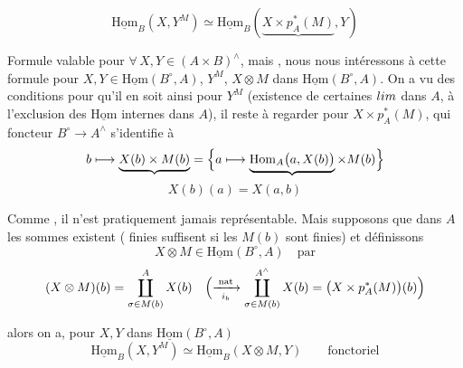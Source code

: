\documentclass[11pt,a4paper]{article}
\begin{document}


\[
\underline{\mathrm{Hom}}_B(X, Y^{M}) \simeq
\underline{\mathrm{Hom}}_B(\underbrace{X \times p_A^{*}(M)}, Y)
\]

Formule valable pour $\forall\, X, Y \in (A \times B)^{\wedge}$, mais
,  nous nous intéressons à cette formule pour
$X, Y \in \underline{\mathrm{Hom}}(B^{\circ}, A)$, \ill{} \ill{} \ill{}
  $Y^{M}$, $X \otimes M$ dans
$\underline{\mathrm{Hom}}(B^{\circ}, A)$. On a vu des conditions
 pour qu'il en soit ainsi pour $Y^{M}$ (existence de
certaines $\varprojlim$ dans $A$, à l'exclusion des
$\underline{\mathrm{Hom}}$ internes dans $A$), il reste à regarder pour
$X \times p_A^{*}(M)$, qui  foncteur $B^{\circ} \to
A^{\wedge}$ s'identifie à
\[
b \longmapsto \underbrace{X(b) \times M(b)} = \Bigl\{ a \longmapsto
\underbrace{\mathrm{Hom}_A\bigl(a, X(b)\bigr)} \times M(b) \Bigr\}
\]
\[
X(b)(a) = X(a, b)
\]

Comme , il n'est pratiquement jamais représentable. Mais
supposons que dans $A$ les sommes existent ( finies
suffisent si les $M(b)$ sont  finies) et définissons
\[
X \otimes M \in \underline{\mathrm{Hom}}(B^{\circ}, A) \quad \text{par}
\]
\[
(X \otimes M)(b) = \coprod^{A}_{\sigma \in M(b)} X(b)
\quad \Bigl( \xrightarrow[\;i_b\;]{\;\text{nat}\;}
\coprod^{A^{\wedge}}_{\sigma \in M(b)} X(b) = \bigl(X \times p_A^{*}(M)\bigr)(b) \Bigr)
\]

alors on a, pour $X, Y$ dans $\underline{\mathrm{Hom}}(B^{\circ}, A)$
\[
\underline{\mathrm{Hom}}_B(X, Y^{M}) \simeq \underline{\mathrm{Hom}}_B(X
\otimes M, Y) \qquad \text{fonctoriel}
\]


\end{document}
